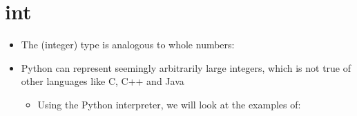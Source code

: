 \documentclass[letterpaper,10pt,english]{sphinxmanual}
\begin{document}
\section{int}
\label{\detokenize{lecture_notes/lec02_calculator:int}}\begin{itemize}
\item {} 
The  (integer) type is analogous to whole numbers:

%
\begin{sphinxVerbatim}[commandchars=\\\{\}]
           
\end{sphinxVerbatim}

\item {} 
Python can represent seemingly arbitrarily large integers, which is
not true of other languages like C, C++ and Java
\begin{itemize}
\item {} 
Using the Python interpreter, we will look at the examples of:

%
\begin{sphinxVerbatim}[commandchars=\\\{\}]
\end{sphinxVerbatim}

\end{itemize}

\end{itemize}
\end{document}
